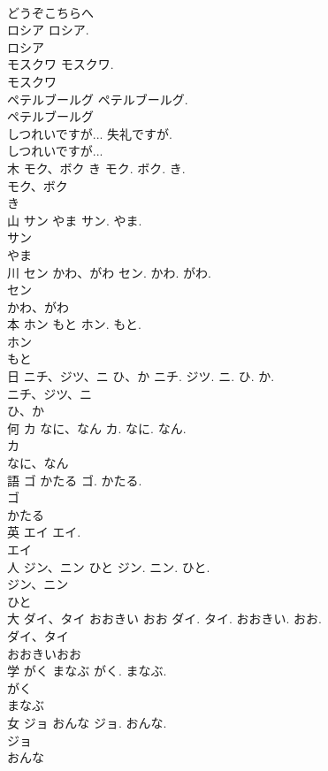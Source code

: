 \documentclass[8pt]{extreport}
\begin{document}
\begin{CJK}{UTF8}{min}
\\	どうぞこちらへ
\\	ロシア		ロシア.	
\\	ロシア
\\	モスクワ		モスクワ.	
\\	モスクワ
\\	ペテルブールグ		ペテルブールグ.	
\\	ペテルブールグ
\\	しつれいですが...		失礼ですが.	
\\	しつれいですが...
\\	木	モク、ボク き	モク. ボク. き.	
\\	モク、ボク
\\	き
\\	山	サン やま	サン. やま.
\\	サン
\\	やま
\\	川	セン かわ、がわ	セン. かわ. がわ.	
\\	セン
\\	かわ、がわ
\\	本	ホン もと	ホン. もと.	
\\	ホン
\\	もと
\\	日	ニチ、ジツ、ニ ひ、か	ニチ. ジツ. ニ. ひ. か.	
\\	ニチ、ジツ、ニ
\\	ひ、か
\\	何	カ なに、なん	カ. なに. なん.	
\\	カ
\\	なに、なん
\\	語	ゴ かたる	ゴ. かたる.	
\\	ゴ
\\	かたる
\\	英	エイ	エイ.	
\\	エイ
\\	人	ジン、ニン ひと	ジン. ニン. ひと.	
\\	ジン、ニン
\\	ひと
\\	大	ダイ、タイ おおきい おお	ダイ. タイ. おおきい. おお.	
\\	ダイ、タイ
\\	おおきいおお
\\	学	がく まなぶ	がく. まなぶ.	
\\	がく
\\	まなぶ
\\	女	ジョ おんな	ジョ. おんな.	
\\	ジョ
\\	おんな

\end{CJK}
\end{document}
